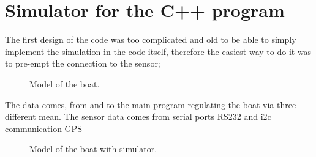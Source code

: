 

\section{Simulator for the C++ program}

The first design of the code was too complicated and old to be able to simply implement the simulation in
the code itself, therefore the easiest way to do it was to pre-empt the connection to the sensor;

\begin{figure}[H]
\centering
{} %
{

}
\caption{Model of the boat.}
\label{fig:model_boat_}
\end{figure}

The data comes, from and to the main program regulating the boat via three different mean.
The sensor data comes from serial ports \gls{RS232} and \gls{i2c} communication \gls{GPS}



\begin{figure}[H]
\centering
{} %
{

}
\caption{Model of the boat with simulator.}
\label{fig:model_boat_sim}
\end{figure}

